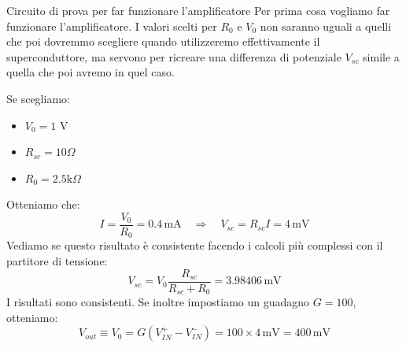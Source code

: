 \documentclass[../main/main.tex]{subfiles}
\begin{document}
\begin{example}{Circuito di prova per far funzionare l'amplificatore}{}
Per prima cosa vogliamo far funzionare l'amplificatore. I valori scelti per \( R_0 \) e \( V_0 \) non saranno uguali a quelli che poi dovremmo scegliere quando utilizzeremo effettivamente il superconduttore, ma servono per ricreare una differenza di potenziale \( V_{sc} \) simile a quella che poi avremo in quel caso.

Se scegliamo:
\begin{itemize}
\item \( V_0 = 1 \) V
\item \( R_{sc} = 10 \Omega \)
\item \( R_0 = 2.5 \text{k} \Omega  \)
\end{itemize}
Otteniamo che:
\begin{equation*}
  I = \frac{V_0}{R_0} = 0.4 \, \text{mA} \quad \Rightarrow \quad V_{sc} = R_{sc} I = 4 \,\text{mV}
\end{equation*}
Vediamo se questo risultato è consistente facendo i calcoli più complessi con il partitore di tensione:
\begin{equation*}
  V_{sc} = V_0 \frac{R_{sc}}{R_{sc}+R_0} = 3.98406 \, \text{mV}
\end{equation*}
I risultati sono consistenti.
Se inoltre impostiamo un guadagno \( G = 100 \), otteniamo:
\begin{equation*}
  V_{out} \equiv V_0 = G(V_{IN}^+ - V_{IN}^-) = 100 \times 4 \,\text{mV} = 400 \,\text{mV}
\end{equation*}
\end{example}
\end{document}
